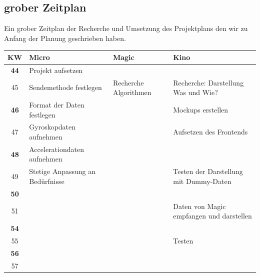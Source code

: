 \documentclass[a4paper, 11pt]{article}
\begin{document}
\subsection{grober Zeitplan}
Ein grober Zeitplan der Recherche und Umsetzung des Projektplans den wir zu Anfang der Planung geschrieben haben.
\begin{center}
    \begin{tabularx}{\textwidth}{ |c|X|X|X| }
        \hline
        \textbf{KW} & \textbf{Micro}                                    & \textbf{Magic}        & \textbf{Kino}                            \\
        \hline
        \textbf{44} & Projekt aufsetzen                                 &                       &                                          \\
        \hline
        45          & Sendemethode festlegen                            & Recherche Algorithmen & Recherche: Darstellung Was und Wie?      \\
        \hline
        \textbf{46} & Format der Daten festlegen                        &                       & Mockups erstellen                        \\
        \hline
        47          &  Gyroskopdaten aufnehmen                          &                       & Aufsetzen des Frontends                  \\
        \hline
        \textbf{48} & Accelerationdaten aufnehmen                       &                       &                                          \\
        \hline
        49          & Stetige Anpassung an Bedürfnisse                  &                       & Testen der Darstellung mit Dummy-Daten   \\
        \hline
        \textbf{50} &                                                   &                       &                                          \\
        \hline
        51          &                                                   &                       & Daten von Magic empfangen und darstellen \\
        \hline
        \textbf{54} &                                                   &                       &                                          \\
        \hline
        55          &                                                   &                       & Testen                                   \\
        \hline
        \textbf{56} &                                                   &                       &                                          \\
        \hline
        57          &                                                   &                       &                                          \\
        \hline
    \end{tabularx}
\end{center}
\end{document}
